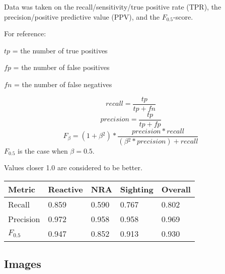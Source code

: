 \documentclass{article}
\begin{document}
Data was taken on the recall/sensitivity/true positive rate (TPR), the precision/positive predictive value (PPV),
and the \(F_{0.5}\)-score.

For reference:

\begin{center}
\(tp\) = the number of true positives

\(fp\) = the number of false positives

\(fn\) = the number of false negatives
\end{center}

\[recall = \frac{tp}{tp + fn}\]
\[precision = \frac{tp}{tp + fp}\]
\[F_{\beta} = (1 + \beta{}^2) * \frac{precision * recall}{(\beta{}^2 * precision) + recall}\]
\(F_{0.5}\) is the case when \(\beta = 0.5\).

Values closer 1.0 are considered to be better.

\begin{center}
    \begin{tabular}{ | l || l | l | l || l |}
    \hline
    Metric & Reactive & NRA & Sighting & Overall\\ \hline
    Recall      & 0.859 & 0.590 & 0.767 & 0.802\\ \hline
    Precision   & 0.972 & 0.958 & 0.958 & 0.969\\ \hline
    \(F_{0.5}\) & 0.947 & 0.852 & 0.913 & 0.930\\ \hline
    \end{tabular}
\end{center}

\subsection{Images}
\label{ssec:images}

\newcommand{\showsteps}[1] {
    \begin{figure}[!htpb]
    \begin{minipage}[b]{0.5\linewidth}
      \centering
      \centerline{\texttt{[image: out\_1\_\#1]}}
      \centerline{(1) Selected region}\medskip
    \end{minipage}%
    \begin{minipage}[b]{0.5\linewidth}
      \centering
      \centerline{\texttt{[image: out\_2\_\#1]}}
      \centerline{(2) Preprocessing performed}\medskip
    \end{minipage}
    
    \begin{minipage}[b]{0.5\linewidth}
      \centering
      \centerline{\texttt{[image: out\_3\_\#1]}}
      \centerline{(3) Canny edge map}\medskip
    \end{minipage}%
    \begin{minipage}[b]{0.5\linewidth}
      \centering
      \centerline{\texttt{[image: out\_4\_\#1]}}
      \centerline{(4) Resulting circles}\medskip
    \end{minipage}
    \caption{State of target#1.jpg through the process}
    \label{fig:res}
    \end{figure}
}
\end{document}
